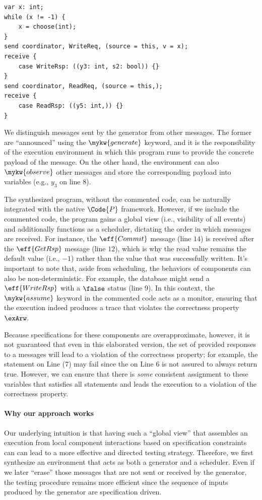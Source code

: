 \begin{verbatim}
var x: int;
while (x != -1) {
    x = choose(int);
}
send coordinator, WriteReq, (source = this, v = x);
receive {
    case WriteRsp: ((y3: int, s2: bool)) {}
}
send coordinator, ReadReq, (source = this,);
receive {
    case ReadRsp: ((y5: int,)) {}
}
\end{verbatim}

\noindent We distinguish messages sent by the generator from other
messages. The former are ``announced'' using the $\mykw{generate}$
keyword, and it is the responsibility of the execution environment in
which this program runs to provide the concrete payload of the
message.  On the other hand, the environment can also $\mykw{observe}$
other messages and store the corresponding payload into variables
(e.g., $y_3$ on line $8$).

The synthesized program, without the commented code, can be naturally
integrated with the native $\Code{P}$ framework.  However, if we
include the commented code, the program gains a global view (i.e.,
visibility of all events) and additionally functions as a scheduler,
dictating the order in which messages are received.  For instance, the
$\eff{Commit}$ message (line $14$) is received after the
$\eff{GetRsp}$ message (line $12$), which is why the read value
remains the default value (i.e., $-1$) rather than the value that was
successfully written.  It's important to note that, aside from
scheduling, the behaviors of components can also be
non-deterministic. For example, the database might send a
$\eff{WriteRsp}$ with a $\false$ status (line $9$). In this context,
the $\mykw{assume}$ keyword in the commented code acts as a monitor,
ensuring that the execution indeed produces a trace that violates the
correctness property $\exArw$.

Because specifications for these components are overapproximate,
however, it is not guaranteed that even in this elaborated version,
the set of provided responses to a messages will lead to a violation
of the correctness property; for example, the  statement
on Line (7) may fail since the  on Line 6 is not assured
to always return true.  However, we can ensure that there is \emph{some}
consistent assignment to these variables that satisfies all
 statements and leads the execution to a violation of the
correctness property.

\paragraph{Why our approach works}  Our underlying intuition is that
having such a ``global view'' that assembles an execution from local
component interactions based on specification constraints can can lead
to a more effective and directed testing strategy. Therefore, we first
synthesize an environment that acts as both a generator and a
scheduler. Even if we later ``erase'' those messages that are not sent
or received by the generator, the testing procedure remains more
efficient since the sequence of inputs produced by the generator are
specification driven.

